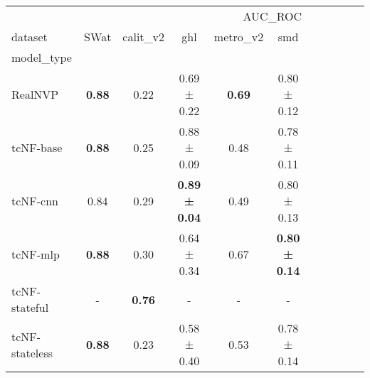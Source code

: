 \begin{tabular}{l|ccccc|ccccc}
\toprule
 & \multicolumn{5}{r}{AUC_ROC} \\
dataset & SWat & calit_v2 & ghl & metro_v2 & smd \\
model_type &  &  &  &  &  \\
\midrule
RealNVP & \bfseries 0.88 & 0.22 & 0.69 ± 0.22 & \bfseries 0.69 & 0.80 ± 0.12 \\
tcNF-base & \bfseries 0.88 & 0.25 & 0.88 ± 0.09 & 0.48 & 0.78 ± 0.11 \\
tcNF-cnn & 0.84 & 0.29 & \bfseries 0.89 ± 0.04 & 0.49 & 0.80 ± 0.13 \\
tcNF-mlp & \bfseries 0.88 & 0.30 & 0.64 ± 0.34 & 0.67 & \bfseries 0.80 ± 0.14 \\
tcNF-stateful & - & \bfseries 0.76 & - & - & - \\
tcNF-stateless & \bfseries 0.88 & 0.23 & 0.58 ± 0.40 & 0.53 & 0.78 ± 0.14 \\
\bottomrule
\end{tabular}
